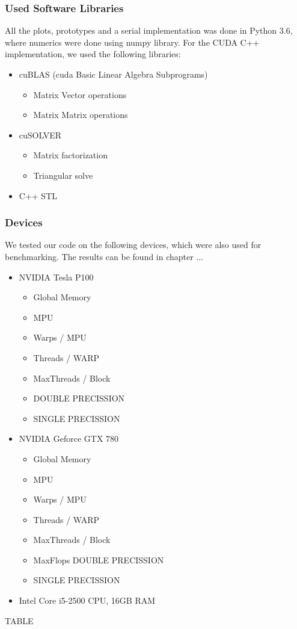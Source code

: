 \subsubsection{Used Software Libraries}
All the plots, prototypes and a serial implementation was done in Python 3.6, where numerics were done using numpy library. For the CUDA C++ implementation, we used the following libraries:
\begin{itemize}
	\item cuBLAS (cuda Basic Linear Algebra Subprograms)
	\begin{itemize}
		\item Matrix Vector operations
		\item Matrix Matrix operations
	\end{itemize}
	\item cuSOLVER
	\begin{itemize}
		\item Matrix factorization
		\item Triangular solve
	\end{itemize}
	\item C++ STL
\end{itemize}
\subsubsection{Devices}
We tested our code on the following devices, which were also used for benchmarking. The results can be found in chapter ...
\begin{itemize}
	\item NVIDIA Tesla P100
	\begin{itemize}
		\item Global Memory
		\item MPU
		\item Warps / MPU
		\item Threads / WARP
		\item MaxThreads / Block
		\item DOUBLE PRECISSION
		\item SINGLE PRECISSION
	\end{itemize}
	\item NVIDIA Geforce GTX 780
		\begin{itemize}
			\item Global Memory
			\item MPU
			\item Warps / MPU
			\item Threads / WARP
			\item MaxThreads / Block
			\item MaxFlops DOUBLE PRECISSION
			\item SINGLE PRECISSION
		\end{itemize}
	\item Intel Core i5-2500 CPU, 16GB RAM
\end{itemize}
\begin{center}
	TABLE
\end{center}
